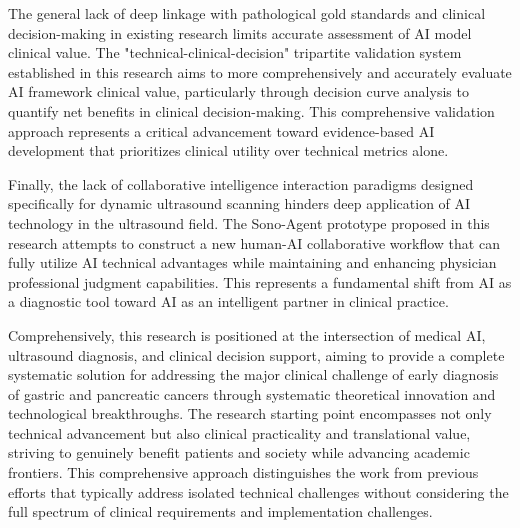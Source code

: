 The general lack of deep linkage with pathological gold standards and clinical decision-making in existing research limits accurate assessment of AI model clinical value. The "technical-clinical-decision" tripartite validation system established in this research aims to more comprehensively and accurately evaluate AI framework clinical value, particularly through decision curve analysis to quantify net benefits in clinical decision-making. This comprehensive validation approach represents a critical advancement toward evidence-based AI development that prioritizes clinical utility over technical metrics alone.

Finally, the lack of collaborative intelligence interaction paradigms designed specifically for dynamic ultrasound scanning hinders deep application of AI technology in the ultrasound field. The Sono-Agent prototype proposed in this research attempts to construct a new human-AI collaborative workflow that can fully utilize AI technical advantages while maintaining and enhancing physician professional judgment capabilities. This represents a fundamental shift from AI as a diagnostic tool toward AI as an intelligent partner in clinical practice.

Comprehensively, this research is positioned at the intersection of medical AI, ultrasound diagnosis, and clinical decision support, aiming to provide a complete systematic solution for addressing the major clinical challenge of early diagnosis of gastric and pancreatic cancers through systematic theoretical innovation and technological breakthroughs. The research starting point encompasses not only technical advancement but also clinical practicality and translational value, striving to genuinely benefit patients and society while advancing academic frontiers. This comprehensive approach distinguishes the work from previous efforts that typically address isolated technical challenges without considering the full spectrum of clinical requirements and implementation challenges.

